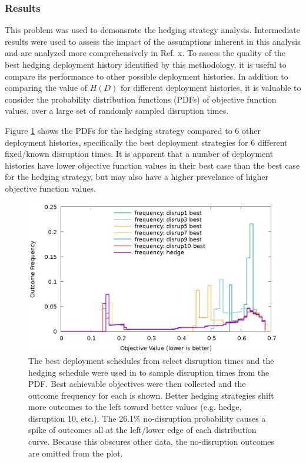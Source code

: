 \subsubsection{Results}

This problem was used to demonsrate the hedging strategy analysis.
Intermediate results were used to assess the impact of the assumptions
inherent in this analysis and are analyzed more comprehensively in
Ref. x.  To assess the quality of the best hedging
deployment history identified by this methodology, it is useful to compare its
performance to other possible deployment histories.  In addition to comparing
the value of $H(D)$ for different deployment histories, it is valuable to
consider the probability distribution functions (PDFs) of objective function
values, over a large set of randomly sampled disruption times.


Figure \ref{fig:exp3-outcome-dists} shows the PDFs for the hedging strategy
compared to 6 other deployment histories, specifically the best deployment
strategies for 6 different fixed/known disruption times.  It is apparent that
a number of deployment histories have lower objective function values in their
best case than the best case for the hedging strategy, but may also have a
higher prevelance of higher objective function values.

\begin{figure}[!htb]
    \centering
    \includegraphics[width=1.0\columnwidth]{dists.eps}
    \caption[Outcome Distributions in Hedging Analysis]{
        The best deployment schedules from select disruption times and the
        hedging schedule were used in to sample disruption times from the PDF.
        Best achievable objectives were then collected and the outcome
        frequency for each is shown.  Better hedging strategies shift more
        outcomes to the left toward better values (e.g. hedge, disruption 10,
        etc.).  The 26.1\% no-disruption probability causes a spike of
        outcomes all at the left/lower edge of each distribution curve.
        Because this obscures other data, the no-disruption outcomes are
        omitted from the plot.
    }
    \label{fig:exp3-outcome-dists}
\end{figure}


